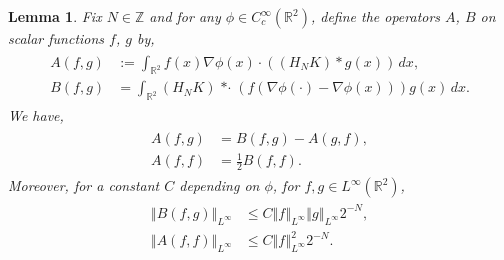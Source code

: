 \documentclass[11pt,reqno,xcolor=svgnames]{amsart}
\def\R{{\mathbb R}}
\def\Z{{\mathbb Z}}
\theoremstyle{plain}
\newtheorem{lemma}[theorem]{Lemma}
\theoremstyle{definition}
\theoremstyle{plain}
\theoremstyle{remark}
\newcommand{\iny}{\ensuremath{\infty}}
\newcommand{\grad}{\ensuremath{\nabla}}
\newcommand{\norm}[1]{\ensuremath{\left\Vert #1 \right\Vert}}
\newcommand{\stardot}{{\mathop{* \cdot}}}
\begin{document}
\begin{lemma}\label{L:ffInt}
    Fix $N \in \Z$ and for any $\phi \in C_c^\iny(\R^2)$, define the operators $A$, $B$ on scalar functions $f$, $g$ by,
    \begin{align}\label{e:ABOperators}
        \begin{split}
    	A(f, g)
			&:= \int_{\R^2} f(x)
    	    \grad \phi(x) \cdot ((H_N K) * g(x)) \, dx, \\
        B(f, g)
            &= \int_{\R^2} (H_N K) \stardot (f (\grad \phi(\cdot) - \grad \phi(x)))
                    g(x) \, dx.
        \end{split}
    \end{align}
    We have,
	\begin{align}\label{e:ffIntId}
        \begin{split}
            A(f, g)
                &= B(f, g)
                    - A(g, f), \\
            A(f, f)
                &= \frac{1}{2}B(f, f).
            \end{split}
    \end{align}
    Moreover, for a constant $C$ depending on $\phi$, for $f, g \in L^\iny(\R^2)$,
	\begin{align}\label{e:ffBound}
        \begin{split}
        \norm{B(f, g)}_{L^\iny}
            &\le C \norm{f}_{L^\iny} \norm{g}_{L^\iny} 2^{-N}, \\
		\norm{A(f, f)}_{L^\iny}
			&\le C \norm{f}_{L^\iny}^2 2^{-N}.
        \end{split}
	\end{align}
\end{lemma}
\end{document}
